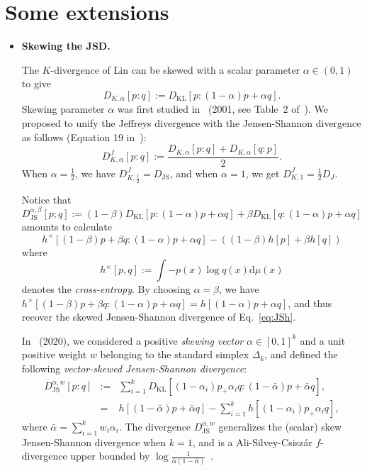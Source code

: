 \documentclass[11pt]{article}
\def\dmu{\mathrm{d}\mu}
\def\KL{\mathrm{KL}}
\def\JS{\mathrm{JS}}
\begin{document}
\section{Some extensions}

\begin{itemize}

	\item {\bf Skewing the JSD.} 
	
	The $K$-divergence of Lin can be skewed with a scalar parameter $\alpha\in(0,1)$ to give
	\begin{equation}\label{eq:divK}
	D_{K,\alpha}[p:q]:=D_\KL\left[p:(1-\alpha)p+\alpha q\right].
	\end{equation}
	Skewing parameter $\alpha$ was first studied in~\citep{skewJS-2001} (2001, see Table~2 of~\citep{skewJS-2001}).
	We proposed to unify the Jeffreys divergence with the Jensen-Shannon divergence as follows (Equation 19 in~\citep{nielsen2010family}):
	\begin{equation}\label{eq:JJSalpha}
	D_{K,\alpha}^J[p:q]:=\frac{D_{K,\alpha}[p:q]+D_{K,\alpha}[q:p]}{2}.
	\end{equation}
	When $\alpha=\frac{1}{2}$, we have $D_{K,\frac{1}{2}}^J=D_\JS$, and when $\alpha=1$, we get $D_{K,1}^J=\frac{1}{2}D_J$.
	
	Notice that 
	$$
	D_\JS^{\alpha,\beta}[p;q]:=(1-\beta)D_\KL[p:(1-\alpha)p+\alpha q]+\beta D_\KL[q:(1-\alpha)p+\alpha q]
	$$ 
	amounts to calculate
	 $$
	h^\times[(1-\beta)p+\beta q:(1-\alpha)p+\alpha q]-((1-\beta)h[p]+\beta h[q])
	$$ 
	where 
	$$
	h^\times[p,q]:=\int -p(x)\log q(x)\dmu(x)
	$$ 
	denotes the {\em cross-entropy}. By choosing $\alpha=\beta$, we have $h^\times[(1-\beta)p+\beta q:(1-\alpha)p+\alpha q]=h[(1-\alpha)p+\alpha q]$, 
	and thus recover the skewed Jensen-Shannon divergence of Eq.~\ref{eq:JSh}.
	
	
	In~\citep{nielsen2020generalization} (2020), we considered a positive {\em skewing vector} $\alpha\in [0,1]^k$  and a unit positive weight $w$ belonging to the standard simplex $\Delta_k$, and defined the following {\em vector-skewed Jensen-Shannon divergence}:
\begin{eqnarray}
	D_\JS^{\alpha,w}[p:q] &:=& \sum_{i=1}^k D_\KL[(1-\alpha_i)p_+\alpha_i q : (1-\bar\alpha)p+\bar\alpha q],\\
	&=& h[(1-\bar\alpha)p+\bar\alpha q]-\sum_{i=1}^k h[(1-\alpha_i)p_+\alpha_i q],
\end{eqnarray}
	where $\bar\alpha=\sum_{i=1}^k w_i\alpha_i$. 
	The divergence $D_\JS^{\alpha,w}$ generalizes the (scalar) skew Jensen-Shannon divergence when $k=1$, and is a Ali-Silvey-Csisz\'ar $f$-divergence upper bounded by $\log \frac{1}{\bar\alpha(1-\bar\alpha)}$~\citep{nielsen2020generalization}.
	

\end{itemize}
\end{document}
